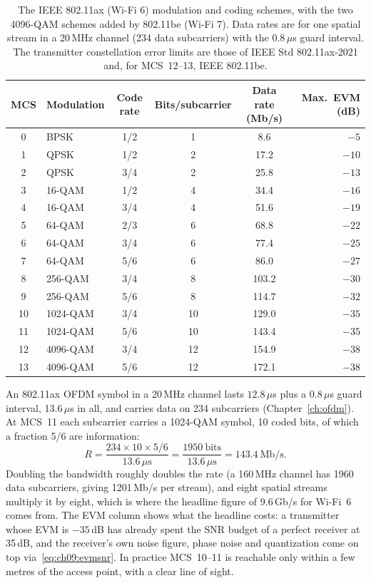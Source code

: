 \begin{table}[H]
\centering
\caption{The IEEE 802.11ax (Wi-Fi 6) modulation and coding schemes, with the two 4096-QAM schemes
added by 802.11be (Wi-Fi 7). Data rates are for one spatial stream in a 20\,MHz channel (234 data
subcarriers) with the 0.8\,$\mu$s guard interval. The transmitter constellation error limits are those
of IEEE Std 802.11ax-2021 and, for MCS~12--13, IEEE 802.11be.}
\label{tab:ch09:wifimcs}
\small
\begin{tabular}{clcccr}
\toprule
MCS & Modulation & Code rate & Bits/subcarrier & Data rate (Mb/s) & Max.\ EVM (dB)\\
\midrule
0 & BPSK & 1/2 & 1 & 8.6 & $-5$\\
1 & QPSK & 1/2 & 2 & 17.2 & $-10$\\
2 & QPSK & 3/4 & 2 & 25.8 & $-13$\\
3 & 16-QAM & 1/2 & 4 & 34.4 & $-16$\\
4 & 16-QAM & 3/4 & 4 & 51.6 & $-19$\\
5 & 64-QAM & 2/3 & 6 & 68.8 & $-22$\\
6 & 64-QAM & 3/4 & 6 & 77.4 & $-25$\\
7 & 64-QAM & 5/6 & 6 & 86.0 & $-27$\\
8 & 256-QAM & 3/4 & 8 & 103.2 & $-30$\\
9 & 256-QAM & 5/6 & 8 & 114.7 & $-32$\\
10 & 1024-QAM & 3/4 & 10 & 129.0 & $-35$\\
11 & 1024-QAM & 5/6 & 10 & 143.4 & $-35$\\
\midrule
12 & 4096-QAM & 3/4 & 12 & 154.9 & $-38$\\
13 & 4096-QAM & 5/6 & 12 & 172.1 & $-38$\\
\bottomrule
\end{tabular}
\end{table}

\begin{worked}
An 802.11ax OFDM symbol in a 20\,MHz channel lasts $12.8\,\mu$s plus a $0.8\,\mu$s guard interval,
13.6\,$\mu$s in all, and carries data on 234 subcarriers (Chapter~\ref{ch:ofdm}). At MCS~11 each
subcarrier carries a 1024-QAM symbol, 10 coded bits, of which a fraction 5/6 are information:
\[
R=\frac{234\times10\times5/6}{13.6\,\mu\text{s}}=\frac{1950\ \text{bits}}{13.6\,\mu\text{s}}=143.4\ \text{Mb/s}.
\]
Doubling the bandwidth roughly doubles the rate (a 160\,MHz channel has 1960 data subcarriers, giving
1201\,Mb/s per stream), and eight spatial streams multiply it by eight, which is where the headline
figure of 9.6\,Gb/s for Wi-Fi~6 comes from. The EVM column shows what the headline costs: a
transmitter whose EVM is $-35$\,dB has already spent the SNR budget of a perfect receiver at 35\,dB,
and the receiver's own noise figure, phase noise and quantization come on top
via~\eqref{eq:ch09:evmsnr}. In practice MCS~10--11 is reachable only within a few metres of the
access point, with a clear line of sight.
\end{worked}

